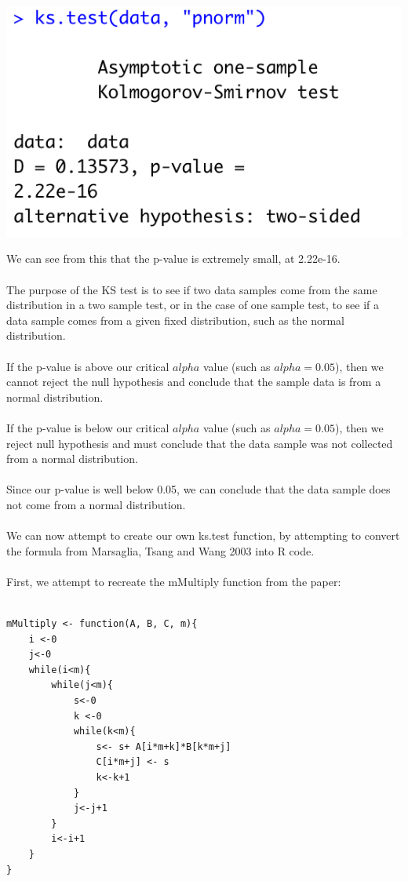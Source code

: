 \documentclass[12pt,letterpaper]{article}
\begin{document}
\includegraphics{ks.test.png}

\noindent We can see from this that the p-value is extremely small, at 2.22e-16.
\\\\
\noindent The purpose of the KS test is to see if two data samples come from the same distribution in a two sample test, or in the case of one sample test, to see if a data sample comes from a given fixed distribution, such as the normal distribution.
\\\\
\noindent If the p-value is above our critical $alpha$ value (such as $alpha = 0.05$), then we cannot reject the null hypothesis and conclude that the sample data is from a normal distribution.
\\\\
\noindent If the p-value is below our critical $alpha$ value (such as $alpha = 0.05$), then we reject null hypothesis and must conclude that the data sample was not collected from a normal distribution.
\\\\
\noindent Since our p-value is well below 0.05, we can conclude that the data sample does not come from a normal distribution.
\\\\
\noindent We can now attempt to create our own ks.test function, by attempting to convert the formula from Marsaglia, Tsang and Wang 2003 into R code.
\\\\
\noindent First, we attempt to recreate the mMultiply function from the paper:
\begin{lstlisting}

mMultiply <- function(A, B, C, m){
	i <-0
	j<-0
	while(i<m){
		while(j<m){
			s<-0
			k <-0
			while(k<m){
				s<- s+ A[i*m+k]*B[k*m+j]
				C[i*m+j] <- s
				k<-k+1
			}
			j<-j+1
		}
		i<-i+1
	}
}
\end{lstlisting}
\end{document}
